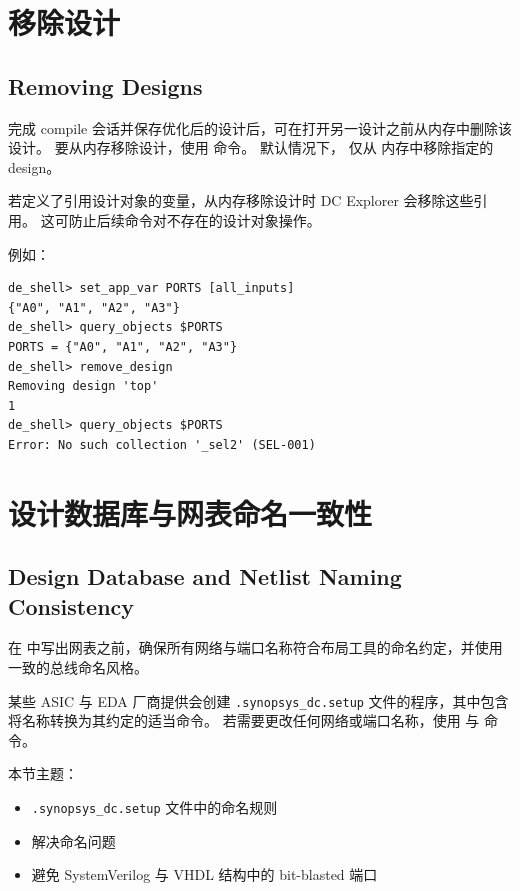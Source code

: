 \section{移除设计}
\subsection*{Removing Designs}

完成 compile 会话并保存优化后的设计后，可在打开另一设计之前从内存中删除该设计。
要从内存移除设计，使用  命令。
默认情况下， 仅从  内存中移除指定的 design。

若定义了引用设计对象的变量，从内存移除设计时 DC Explorer 会移除这些引用。
这可防止后续命令对不存在的设计对象操作。

例如：
\begin{lstlisting}
de_shell> set_app_var PORTS [all_inputs]
{"A0", "A1", "A2", "A3"}
de_shell> query_objects $PORTS
PORTS = {"A0", "A1", "A2", "A3"}
de_shell> remove_design
Removing design 'top'
1
de_shell> query_objects $PORTS
Error: No such collection '_sel2' (SEL-001)
\end{lstlisting}

\section{设计数据库与网表命名一致性}
\subsection*{Design Database and Netlist Naming Consistency}

在  中写出网表之前，确保所有网络与端口名称符合布局工具的命名约定，并使用一致的总线命名风格。

某些 ASIC 与 EDA 厂商提供会创建 \texttt{.synopsys\_dc.setup} 文件的程序，其中包含将名称转换为其约定的适当命令。
若需要更改任何网络或端口名称，使用  与  命令。

本节主题：
\begin{itemize}
  \item \texttt{.synopsys\_dc.setup} 文件中的命名规则
  \item 解决命名问题
  \item 避免 SystemVerilog 与 VHDL 结构中的 bit-blasted 端口
\end{itemize}

